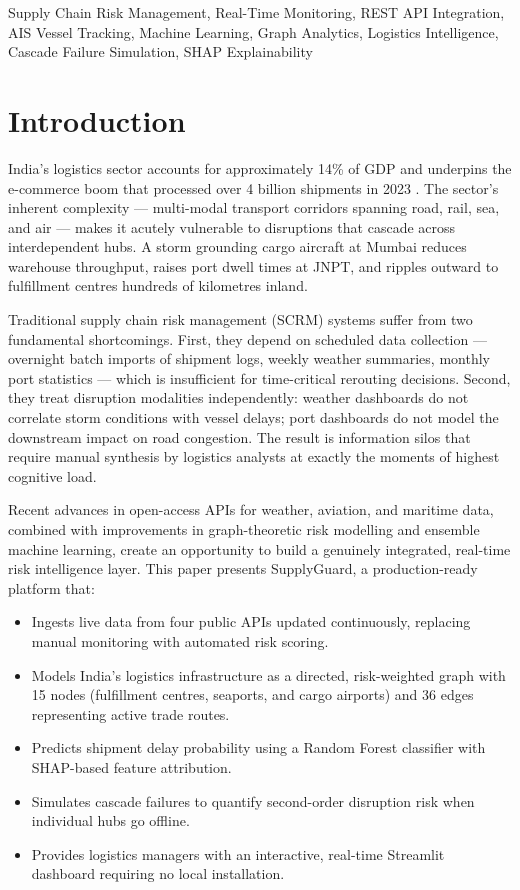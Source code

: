 \documentclass[conference]{IEEEtran}
\begin{document}
\begin{IEEEkeywords}
Supply Chain Risk Management, Real-Time Monitoring, REST API Integration,
AIS Vessel Tracking, Machine Learning, Graph Analytics, Logistics Intelligence,
Cascade Failure Simulation, SHAP Explainability
\end{IEEEkeywords}

\section{Introduction}

India's logistics sector accounts for approximately 14\% of GDP \cite{india_logistics_report}
and underpins the e-commerce boom that processed over 4 billion
shipments in 2023 \cite{ecommerce_india}. The sector's inherent complexity —
multi-modal transport corridors spanning road, rail, sea, and air —
makes it acutely vulnerable to disruptions that cascade across
interdependent hubs. A storm grounding cargo aircraft at Mumbai reduces
warehouse throughput, raises port dwell times at JNPT, and ripples
outward to fulfillment centres hundreds of kilometres inland.

Traditional supply chain risk management (SCRM) systems
suffer from two fundamental shortcomings. First, they depend on
scheduled data collection — overnight batch imports of shipment
logs, weekly weather summaries, monthly port statistics — which
is insufficient for time-critical rerouting decisions. Second, they
treat disruption modalities independently: weather dashboards do
not correlate storm conditions with vessel delays; port dashboards
do not model the downstream impact on road congestion. The result
is information silos that require manual synthesis by logistics
analysts at exactly the moments of highest cognitive load.

Recent advances in open-access APIs for weather, aviation, and
maritime data, combined with improvements in graph-theoretic
risk modelling and ensemble machine learning, create an opportunity
to build a genuinely integrated, real-time risk intelligence layer.
This paper presents SupplyGuard, a production-ready platform that:

\begin{itemize}
  \item Ingests live data from four public APIs updated continuously,
    replacing manual monitoring with automated risk scoring.
  \item Models India's logistics infrastructure as a directed,
    risk-weighted graph with 15 nodes (fulfillment centres, seaports,
    and cargo airports) and 36 edges representing active trade routes.
  \item Predicts shipment delay probability using a Random Forest
    classifier with SHAP-based feature attribution.
  \item Simulates cascade failures to quantify second-order disruption
    risk when individual hubs go offline.
  \item Provides logistics managers with an interactive, real-time
    Streamlit dashboard requiring no local installation.
\end{itemize}
\end{document}
